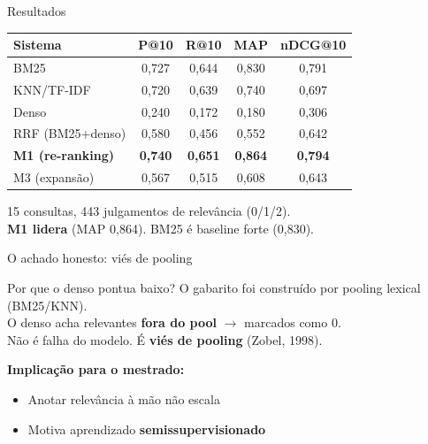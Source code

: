 \documentclass{beamer}
\begin{document}
\begin{frame}{Resultados}
  \begin{table}
    \centering\small
    \begin{tabular}{@{}lcccc@{}}
      \toprule
      \textbf{Sistema} & \textbf{P@10} & \textbf{R@10} & \textbf{MAP} & \textbf{nDCG@10} \\
      \midrule
      BM25              & 0,727 & 0,644 & 0,830 & 0,791 \\
      KNN/TF-IDF        & 0,720 & 0,639 & 0,740 & 0,697 \\
      Denso             & 0,240 & 0,172 & 0,180 & 0,306 \\
      RRF (BM25+denso)  & 0,580 & 0,456 & 0,552 & 0,642 \\
      \textbf{M1 (re-ranking)} & \textbf{0,740} & \textbf{0,651} & \textbf{0,864} & \textbf{0,794} \\
      M3 (expansão)     & 0,567 & 0,515 & 0,608 & 0,643 \\
      \bottomrule
    \end{tabular}
  \end{table}

  \vspace{0.3em}
  {\small 15 consultas, 443 julgamentos de relevância (0/1/2).\\
  \textbf{M1 lidera} (MAP 0,864). BM25 é baseline forte (0,830).}
\end{frame}


\begin{frame}{O achado honesto: viés de pooling}
  \begin{alertblock}{Por que o denso pontua baixo?}
    O gabarito foi construído por pooling lexical (BM25/KNN).\\
    O denso acha relevantes \textbf{fora do pool} $\rightarrow$ marcados como 0.\\
    Não é falha do modelo. É \textbf{viés de pooling} (Zobel, 1998).
  \end{alertblock}

  \vspace{0.5em}
  \textbf{Implicação para o mestrado:}
  \begin{itemize}
    \item Anotar relevância à mão não escala
    \item Motiva aprendizado \textbf{semissupervisionado}
  \end{itemize}
\end{frame}
\end{document}
